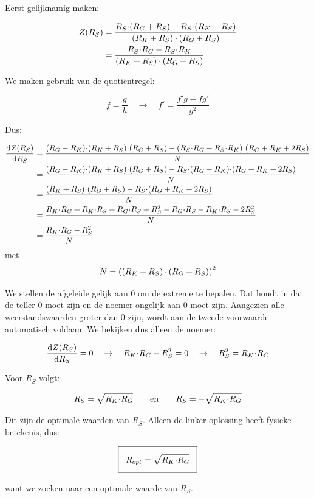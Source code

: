 \documentclass[12pt,a4paper,final,twoside,fleqn]{article}
\newcommand{\ropt}{R_{opt}}
\let\oldcdot\cdot
\renewcommand{\cdot}{\kern-.10em\oldcdot\kern-.10em}
\newcommand{\cdotw}{\kern.08em\oldcdot\kern.08em}
\begin{document}
Eerst gelijknamig maken:

\begin{equation}
\begin{split}
Z(R_S) &= \dfrac{R_S\cdot(R_G+R_S)-R_S\cdot(R_K+R_S)}{(R_K+R_S)\cdotw(R_G+R_S)} \\
       &= \dfrac{R_S\cdot R_G - R_S\cdot R_K}{(R_K+R_S)\cdotw(R_G+R_S)}
\end{split}
\end{equation}

We maken gebruik van de quoti\"entregel:

\begin{equation}
f = \dfrac{g}{h} \quad \rightarrow \quad f' = \dfrac{f'g-fg'}{g^2}
\end{equation}

Dus:

\begin{equation}
\begin{split}
\dfrac{\text{d} Z(R_S)}{\text{d} R_S} &= 
\dfrac{(R_G-R_K)\cdot(R_K+R_S)\cdot(R_G+R_S) - (R_S\cdot R_G - R_S\cdot R_K)\cdot(R_G+R_K+2R_S)}{N} \\
&= \dfrac{(R_G-R_K)\cdot(R_K+R_S)\cdot(R_G+R_S) - R_S\cdot(R_G - R_K)\cdot(R_G+R_K+2R_S)}{N} \\
&= \dfrac{(R_K+R_S)\cdot(R_G+R_S) - R_S\cdot(R_G+R_K+2R_S)}{N} \\
&= \dfrac{R_K\cdot R_G + R_K\cdot R_S + R_G\cdot R_S + R_S^2 - R_G\cdot R_S - R_K\cdot R_S -2R_S^2}{N} \\
&= \dfrac{R_K\cdot R_G - R_S^2}{N}
\end{split}
\end{equation}
met
\begin{equation}
N = \left((R_K+R_S)\cdotw(R_G+R_S)\right)^2
\end{equation}

We stellen de afgeleide gelijk aan 0 om de extreme te bepalen. Dat houdt in dat
de teller 0 moet zijn en de noemer ongelijk aan 0 moet zijn. Aangezien alle
weerstandswaarden groter dan 0 zijn, wordt aan de tweede voorwaarde automatisch
voldaan. We bekijken dus alleen de noemer:

\begin{equation}
\dfrac{\text{d} Z(R_S)}{\text{d} R_S} = 0 \quad\rightarrow\quad  R_K\cdot R_G - R_S^2 = 0
\quad\rightarrow\quad R_S^2 = R_K\cdot R_G
\end{equation}

Voor $R_S$ volgt:

\begin{equation}
R_S = \sqrt{R_K\cdot R_G} \qquad\text{en}\qquad R_S = -\sqrt{R_K\cdot R_G}
\end{equation}

Dit zijn de optimale waarden van $R_S$. Alleen de linker oplossing heeft fysieke
betekenis, dus:

\begin{equation}
\setlength\fboxsep{2ex}
\boxed{\ropt = \sqrt{R_K\cdot R_G}}
\end{equation}

want we zoeken naar een optimale waarde van $R_S$.

\newpage
{}
\printbibliography{}
\end{document}
